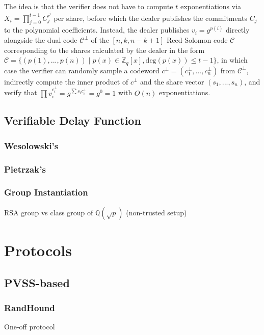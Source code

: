 \documentclass[11pt]{article}
\theoremstyle{definition}
\theoremstyle{remark}
\begin{document}
The idea is that the verifier does not have to compute $t$ exponentiations via $X_i = \prod_{j = 0}^{t - 1} C_j^{i^j}$ per share, before which the dealer publishes the commitments $C_j$ to the polynomial coefficients. Instead, the dealer publishes $v_i = g^{p(i)}$ directly alongside the dual code $\mathcal{C}^\perp$ of the $[n, k, n - k + 1]$ Reed-Solomon code $\mathcal{C}$ corresponding to the shares calculated by the dealer in the form $\mathcal{C} = \{(p(1), ..., p(n)) \mid p(x) \in \mathbb{Z}_q[x], \text{deg}(p(x)) \leq t - 1\}$, in which case the verifier can randomly sample a codeword $c^\perp = (c_1^\perp, ..., c_n^\perp)$ from $\mathcal{C}^\perp$, indirectly compute the inner product of $c^\perp$ and the share vector $(s_1, ..., s_n)$, and verify that $\prod v_i^{c_i^\perp} = g^{\sum s_i c_i^\perp} = g^0 = 1$ with $O(n)$ exponentiations.


\subsection{Verifiable Delay Function}
\subsubsection{Wesolowski's}
\subsubsection{Pietrzak's}
\subsubsection{Group Instantiation}
RSA group vs class group of $\mathbb{Q}(\sqrt{p})$ (non-trusted setup)

\section{Protocols}
\subsection{PVSS-based}

\subsubsection{RandHound}
One-off protocol
\end{document}
